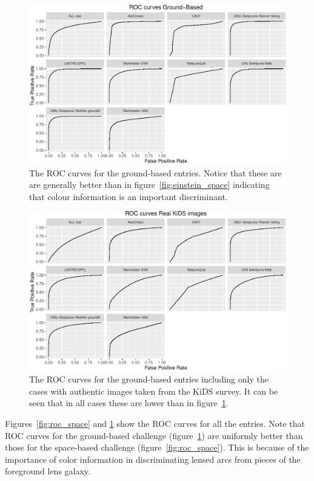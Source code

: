 \documentclass[useAMS,usenatbib]{mnras}
\begin{document}
\begin{figure}
 \includegraphics[width=2\columnwidth]{figures/roc_ground.pdf}
 \caption{The ROC curves for the ground-based entries.  Notice that these are are generally better than in figure~\ref{fig:einstein_space} indicating that colour information is an important discriminant. }
 \label{fig:roc_ground}
\end{figure}

\begin{figure}
 \includegraphics[width=2\columnwidth]{figures/roc_kids.pdf}
 \caption{The ROC curves for the ground-based entries including only the cases with authentic images taken from the KiDS survey.  It can be seen that in all cases these are lower than in figure~\ref{fig:roc_ground}.}
 \label{fig:roc_kids}
\end{figure}

Figures~\ref{fig:roc_space} and \ref{fig:roc_ground} show the ROC curves for all the entries.  
Note that ROC curves for the ground-based challenge (figure~\ref{fig:roc_ground}) are uniformly better than those for the space-based challenge (figure~\ref{fig:roc_space}).  This is because of the importance of color information in discriminating lensed arcs from pieces of the foreground lens galaxy.
\end{document}
